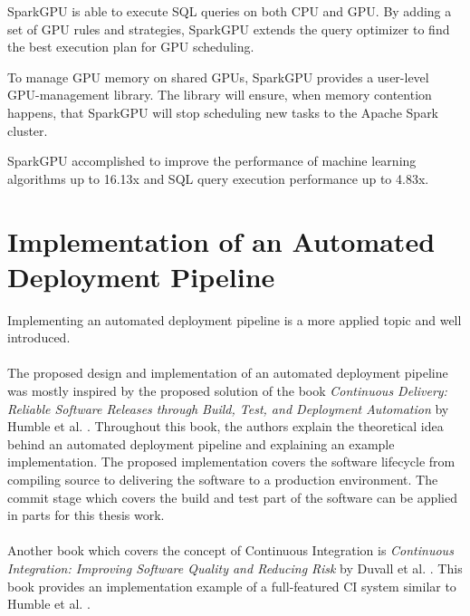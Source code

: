 SparkGPU is able to execute SQL queries on both CPU and GPU.
By adding a set of GPU rules and strategies, SparkGPU extends the query optimizer to find the best execution plan for GPU scheduling.

To manage GPU memory on shared GPUs, SparkGPU provides a user-level GPU-management library.
The library will ensure, when memory contention happens, that SparkGPU will stop scheduling new tasks to the Apache Spark cluster.

SparkGPU accomplished to improve the performance of machine learning algorithms up to 16.13x and SQL query execution performance up to 4.83x.


\section{Implementation of an Automated Deployment Pipeline}
Implementing an automated deployment pipeline is a more applied topic and well introduced.


\paragraph{}The proposed design and implementation of an automated deployment pipeline was mostly inspired by the proposed solution of the book \textit{Continuous Delivery: Reliable Software Releases through Build, Test, and Deployment Automation} by Humble et al. \cite{Farley2010CI}.
Throughout this book, the authors explain the theoretical idea behind an automated deployment pipeline and explaining an example implementation.
The proposed implementation covers the software lifecycle from compiling source to delivering the software to a production environment.
The commit stage which covers the build and test part of the software can be applied in parts for this thesis work.


\paragraph{}Another book which covers the concept of Continuous Integration is \textit{Continuous Integration: Improving Software Quality and Reducing Risk} by Duvall et al. \cite{Duvall2007CI}. This book provides an implementation example of a full-featured CI system similar to Humble et al. \cite{Farley2010CI}.
